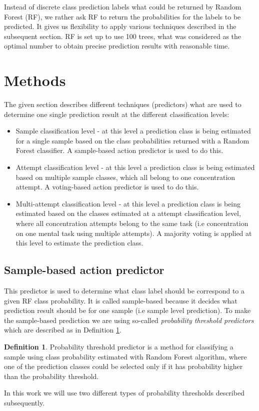 \documentclass[12pt]{article}
\theoremstyle{definition}
\newtheorem{definition}{Definition}[section]
\begin{document}
Instead of discrete class prediction labels what could be returned by Random Forest (RF), we rather ask RF to return the probabilities for the labels to be predicted. It gives us flexibility to apply various techniques described in the subsequent section. RF is set up to use 100 trees, what was considered as the optimal number to obtain precise prediction results with reasonable time.

\newpage
\section{Methods} \label{methods}

The given section describes different techniques (predictors) what are used to determine one single prediction result at the different classification levels:
\begin{itemize}
\item Sample classification level - at this level a prediction class is being estimated for a single sample based on the class probabilities returned with a Random Forest classifier. A sample-based action predictor is used to do this.
\item Attempt classification level - at this level a prediction class is being estimated based on multiple sample classes, which all belong to one concentration attempt. A voting-based action predictor  is used to do this.
\item Multi-attempt classification level - at this level a prediction class is being estimated based on the classes estimated at a attempt classification level, where all concentration attempts belong to the same task (i.e concentration on one mental task using multiple attempts). A majority voting is applied at this level to estimate the prediction class.
\end{itemize}

\subsection{Sample-based action predictor}

This predictor is used to determine what class label should be correspond to a given RF class probability. It is called sample-based because it decides what prediction result should be for one sample (i.e sample level prediction). To make the sample-based prediction we are using so-called \textit{probability threshold predictors} which are described as in Definition \ref{def:prb_thr}.
\theoremstyle{definition}
\begin{definition}
\label{def:prb_thr}
Probability threshold predictor is a method for classifying a sample using class probability estimated with Random Forest algorithm, where one of the prediction classes could be selected only if it has probability higher than the probability threshold. 
\end{definition}
In this work we will use two different types of probability thresholds described subsequently. 
\end{document}
